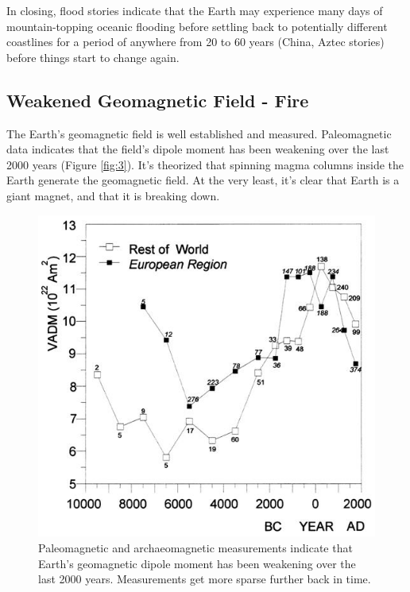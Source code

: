 \documentclass[10pt,twocolumn,letterpaper]{article}
\begin{document}
In closing, flood stories indicate that the Earth may experience many days of mountain-topping oceanic flooding before settling back to potentially different coastlines for a period of anywhere from 20 to 60 years (China, Aztec stories) \cite{5,6} before things start to change again.

\subsection{Weakened Geomagnetic Field - Fire}

The Earth's geomagnetic field is well established and measured. Paleomagnetic data indicates that the field's dipole moment has been weakening over the last 2000 years \cite{9} (Figure \ref{fig:3}). It's theorized that spinning magma columns inside the Earth generate the geomagnetic field. At the very least, it's clear that Earth is a giant magnet, and that it is breaking down.

\begin{figure}[t]
\begin{center}
   \includegraphics[width=1\linewidth]{paleo.png}
\end{center}
   \caption{Paleomagnetic and archaeomagnetic measurements indicate that Earth's geomagnetic dipole moment has been weakening over the last 2000 years. Measurements get more sparse further back in time. \cite{11}}
\label{fig:3}
\label{fig:onecol}
\end{figure}
\end{document}
